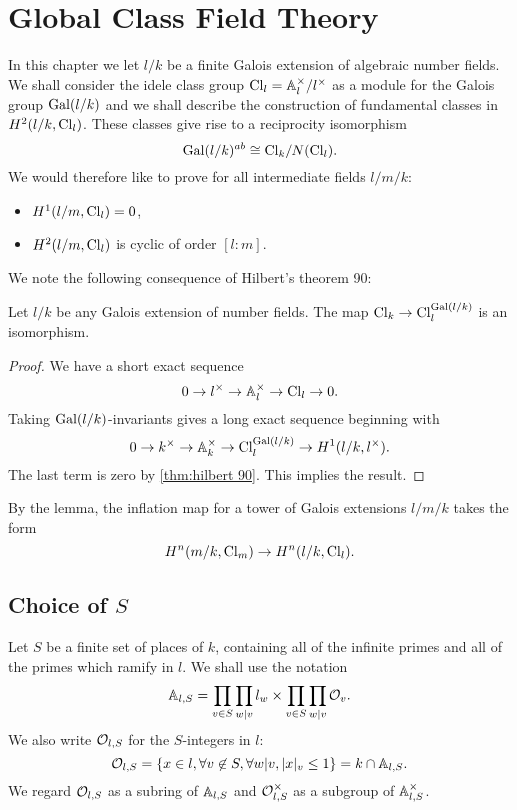 \chapter{Global Class Field Theory}

In this chapter we let $l/k$ be a finite Galois extension of
algebraic number fields. We shall consider the idele class group $\mathrm{Cl}_l = {\mathbb A}_l^\times / l^\times$
as a module for the Galois group $\mathrm{Gal}(l/k)$ and we shall describe the construction of
fundamental classes in $H^2(l/k, \mathrm{Cl}_l)$.
These classes give rise to a reciprocity isomorphism
\[
	\mathrm{Gal}(l/k)^{ab} \cong \mathrm{Cl}_k / N(\mathrm{Cl}_l).
\]
We would therefore like to prove for all intermediate fields $l / m / k$:
\begin{itemize}
	\item
	$H^1(l/m, \mathrm{Cl}_l) = 0$,
	\item
	$H^2(l/m, \mathrm{Cl}_l)$ is cyclic of order $[l:m]$.
\end{itemize}

We note the following consequence of Hilbert's theorem 90:

\begin{lemma} \label{lem:idele class invariants}
	Let $l/k$ be any Galois extension of number fields.
	The map $\mathrm{Cl}_k \to \mathrm{Cl}_l ^ {\mathrm{Gal}(l/k)}$ is an isomorphism.
\end{lemma}

\begin{proof}
	We have a short exact sequence
	\[
		0 \to l^\times \to {\mathbb A}_l^\times \to \mathrm{Cl}_l \to 0.
	\]
	Taking $\mathrm{Gal}(l/k)$-invariants gives a long exact sequence beginning with
	\[
		0 \to k^\times \to {\mathbb A}_k^\times \to \mathrm{Cl}_l^{\mathrm{Gal}(l/k)} \to H^1(l/k, l^\times).
	\]
	The last term is zero by \ref{thm:hilbert 90}. This implies the result.
\end{proof}

By the lemma, the inflation map for a tower of Galois extensions $l/m/k$ takes the form
\[
	H^n(m/k, \mathrm{Cl}_m) \to H^n(l/k, \mathrm{Cl}_l).
\]






\section{Choice of $S$}

Let $S$ be a finite set of places of $k$, containing all of the infinite primes and all
of the primes which ramify in $l$.
We shall use the notation
\[
	{\mathbb A}_{l,S} = \prod_{v \in S} \prod_{w | v} l_w \times \prod_{v \in S} \prod_{w | v} {\mathcal O}_v.
\]
We also write ${\mathcal O}_{l,S}$ for the $S$-integers in $l$:
\[
	{\mathcal O}_{l,S} = \{x \in l, \forall v \not\in S, \forall w | v, |x|_v \le 1\} = k \cap {\mathbb A}_{l,S}.
\]
We regard ${\mathcal O}_{l,S}$ as a subring of ${\mathbb A}_{l,S}$ and
${\mathcal O}_{l,S}^\times$ as a subgroup of ${\mathbb A}_{l,S}^\times$.


